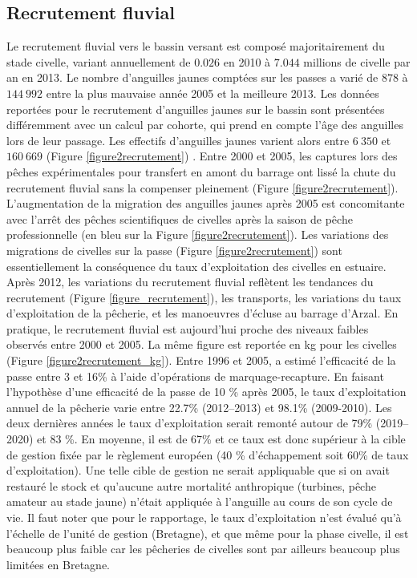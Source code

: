 \documentclass[10pt,twocolumn,titlepage,twoside]{article}\usepackage[]{graphicx}\usepackage[]{xcolor}
\begin{document}
\subsection{Recrutement fluvial}




Le recrutement fluvial vers le bassin versant
est composé majoritairement du stade civelle, variant annuellement de
$0.026$ en 2010 à
$7.044$ millions de civelle par an en 
2013. 
Le nombre d'anguilles jaunes comptées sur les passes a varié de
$878$ à  $144~992$
entre la plus mauvaise année 2005 et la meilleure
2013. Les données reportées pour le recrutement
d'anguilles jaunes sur le bassin sont présentées différemment avec un calcul par
cohorte, qui prend en compte l'âge des anguilles lors de leur passage. Les
effectifs d'anguilles jaunes varient alors entre
$6~350$ et $160~669$ 
(Figure \ref{figure2recrutement}) \citep{briand_gestion_2017}.
Entre 2000 et 2005, les captures lors des pêches expérimentales pour
transfert en amont du barrage ont lissé la chute du recrutement fluvial sans la
compenser pleinement (Figure \ref{figure2recrutement}). L'augmentation de la
migration des anguilles jaunes après 2005 est concomitante avec
l'arrêt des pêches scientifiques de civelles
après la saison de pêche professionnelle (en bleu sur la Figure
\ref{figure2recrutement}). Les variations des migrations de civelles sur la
passe (Figure \ref{figure2recrutement}) sont essentiellement la conséquence du taux
d'exploitation des civelles en estuaire.
Après 2012, les variations du recrutement fluvial reflètent les tendances du
recrutement (Figure \ref{figure_recrutement}), les transports, les variations
du taux d'exploitation de la pêcherie, et les manoeuvres d'écluse au barrage
d'Arzal. En pratique, le recrutement fluvial est aujourd'hui proche des
niveaux faibles observés entre 2000 et 2005. La même figure est reportée en kg
pour les civelles (Figure \ref{figure2recrutement_kg}).
Entre 1996 et 2005, \citet{briand_dynamique_2009} a estimé l'efficacité de la
passe entre 3 et 16\% à l'aide d'opérations de marquage-recapture. En faisant
l'hypothèse d'une efficacité de la passe de 10 \% après 2005, le taux
d'exploitation annuel de la pêcherie varie entre 22.7\% (2012--2013) et 98.1\%
(2009-2010). Les deux dernières années le taux d'exploitation serait remonté autour de 79\%
(2019--2020) et 83 \%. En moyenne, il est de 67\% et ce taux est donc supérieur
à la cible de gestion fixée par le règlement européen (40 \% d'échappement soit
60\% de taux d'exploitation). Une telle cible de gestion ne serait appliquable
que si on avait restauré le stock et qu'aucune autre mortalité anthropique
(turbines, pêche amateur au stade jaune) n'était appliquée à l'anguille au
cours de son cycle de vie.
Il faut noter que pour le rapportage, le taux d'exploitation n'est évalué qu'à l'échelle 
de l'unité de gestion (Bretagne), et que même pour la phase civelle, il est
beaucoup plus faible car les pêcheries de civelles sont par ailleurs beaucoup
plus limitées en Bretagne.
\end{document}
